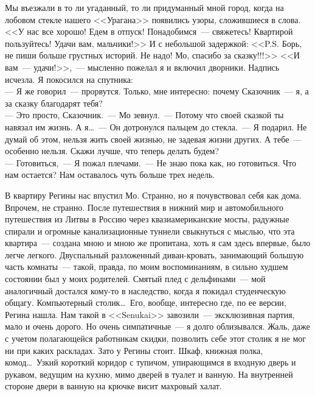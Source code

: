 Мы въезжали в то ли угаданный, то ли придуманный мной город, когда на лобовом 
стекле нашего <<Урагана>> появились узоры, сложившиеся в слова. <<У нас все 
хорошо! Едем в отпуск! Понадобимся~--- свяжетесь! Квартирой пользуйтесь! Удачи вам, 
мальчики!>> И с небольшой задержкой: <<P.S. Борь, не пиши больше грустных 
историй. Не надо! Мо, спасибо за сказку!!!>> <<И вам~--- удачи!>>,~--- мысленно пожелал 
я и включил дворники. Надпись исчезла. Я покосился на спутника:\\
--- Я же говорил~--- прорвутся. Только, мне интересно: почему Сказочник~--- я, а 
за сказку благодарят тебя?\\
--- Это просто, Сказочник.~--- Мо зевнул.~--- Потому что своей сказкой ты навязал 
им жизнь. А я\ldots~--- Он дотронулся пальцем до стекла.~--- Я подарил. Не думай 
об этом, нельзя жить своей жизнью, не задевая жизни других. А тебе~--- особенно нельзя. 
Скажи лучше, что теперь делать будем?\\
--- Готовиться,~--- Я пожал плечами.~--- Не знаю пока как, но готовиться. Что нам 
остается? Нам оставалось чуть больше трех недель.


В квартиру Регины нас впустил Мо. Странно, но я почувствовал себя как дома. 
Впрочем, не странно. После путешествия в нижний мир и автомобильного 
путешествия из Литвы в Россию через квазиамериканские мосты, радужные спирали и огромные 
канализационные туннели свыкнуться с мыслью, что эта квартира~--- создана мною 
и мною же пропитана, хоть я сам здесь впервые, было легче легкого. Двуспальный 
разложенный диван-кровать, занимающий большую часть комнаты~--- такой, правда, 
по моим воспоминаниям, в сильно худшем состоянии был у моих родителей. Смятый плед 
с дельфинами~--- мой аналогичный достался кому-то в наследство, когда я покидал 
студенческую общагу. Компьютерный столик\ldots\ Его, вообще, интересно где, по 
ее версии, Регина нашла. Нам такой в <<Senukai>> завозили~--- эксклюзивная партия, 
мало и очень дорого. Но очень симпатичные~--- я долго облизывался. Жаль, даже с 
учетом полагающейся работникам скидки, позволить себе этот столик я не мог ни при 
каких раскладах. Зато у Регины стоит. Шкаф, книжная полка, комод\ldots\ Узкий 
короткий коридор с тупичом, упирающимся в входную дверь и рукавом, ведущим на кухню, 
мимо дверей в туалет и ванную. На внутренней стороне двери в ванную на крючке висит 
махровый халат.

